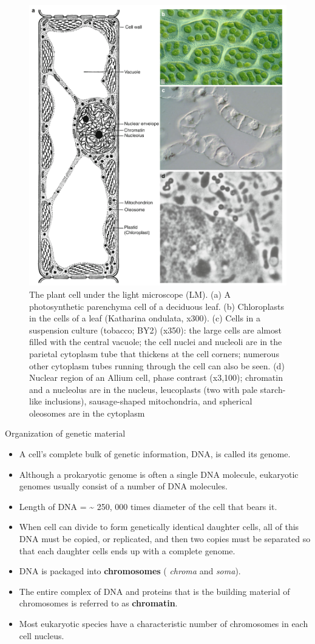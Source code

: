 \documentclass[11pt,ignorenonframetext,aspectratio=169]{beamer}
\providecommand{\tightlist}{%
  \setlength{\itemsep}{0pt}\setlength{\parskip}{0pt}}
\begin{document}
\begin{frame}{}
\protect\hypertarget{section}{}
\begin{figure}
\includegraphics[width=0.45\linewidth]{../images/cell_structure_plant} \caption{The plant cell under the light microscope (LM). (a) A photosynthetic parenchyma cell of a deciduous leaf. (b) Chloroplasts in the cells of a leaf (Katharina ondulata, x300). (c) Cells in a suspension culture (tobacco; BY2) (x350): the large cells are almost filled with the central vacuole; the cell nuclei and nucleoli are in the parietal cytoplasm tube that thickens at the cell corners; numerous other cytoplasm tubes running through the cell can also be seen. (d) Nuclear region of an Allium cell, phase contrast (x3,100); chromatin and a nucleolus are in the nucleus, leucoplasts (two with pale starch-like inclusions), sausage-shaped mitochondria, and spherical oleosomes are in the cytoplasm}\label{fig:cell-structure-plant}
\end{figure}
\end{frame}

\begin{frame}{Organization of genetic material}
\protect\hypertarget{organization-of-genetic-material}{}
\begin{itemize}
\tightlist
\item
  A cell's complete bulk of genetic information, DNA, is called its
  genome.
\item
  Although a prokaryotic genome is often a single DNA molecule,
  eukaryotic genomes usually consist of a number of DNA molecules.
\item
  Length of DNA = \textasciitilde{} 250, 000 times diameter of the cell
  that bears it.
\item
  When cell can divide to form genetically identical daughter cells, all
  of this DNA must be copied, or replicated, and then two copies must be
  separated so that each daughter cells ends up with a complete genome.
\item
  DNA is packaged into \textbf{chromosomes} ( \emph{chroma} and
  \emph{soma}).
\item
  The entire complex of DNA and proteins that is the building material
  of chromosomes is referred to as \textbf{chromatin}.
\item
  Most eukaryotic species have a characteristic number of chromosomes in
  each cell nucleus.
\end{itemize}
\end{frame}
\end{document}
